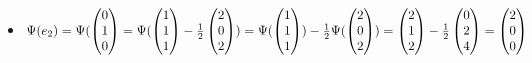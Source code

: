 \begin{itemize}
\item $\Psi(e_2)=\Psi(\begin{pmatrix} 0 \\ 1\\0\end{pmatrix}=\Psi(\begin{pmatrix}1\\1\\1 \end{pmatrix}-\frac{1}{2}\begin{pmatrix} 2\\0\\2\end{pmatrix})=\Psi(\begin{pmatrix}1\\1\\1 \end{pmatrix})-\frac{1}{2}\Psi(\begin{pmatrix} 2\\0\\2\end{pmatrix})\\=\begin{pmatrix}2 \\ 1 \\ 2 \end{pmatrix}-\frac{1}{2} \begin{pmatrix}0\\2\\4 \end{pmatrix}= \begin{pmatrix}2\\0\\0\end{pmatrix}$

\end{itemize}

